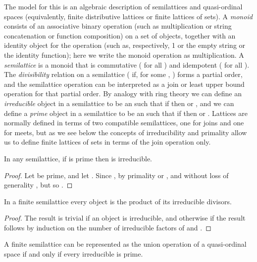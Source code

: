 \documentclass[11pt]{llncs}
\begin{document}
{The model for this is an algebraic description of semilattices and quasi-ordinal spaces (equivalently, finite distributive lattices or finite lattices of sets). A \emph{monoid} consists of an associative binary operation (such as multiplication or string concatenation or function composition) on a set of objects, together with an identity object for the operation (such as, respectively, 1 or the empty string or the identity function); here we write the monoid operation as multiplication. A \emph{semilattice} is a monoid that is commutative ( for all ) and idempotent ( for all ). The \emph{divisibility} relation on a semilattice ( if, for some , ) forms a partial order, and the semilattice operation can be interpreted as a join or least upper bound operation for that partial order. By analogy with ring theory we can define an \emph{irreducible} object in a semilattice to be an  such that if  then  or , and we can define a \emph{prime} object in a semilattice to be an  such that if  then  or . Lattices are normally defined in terms of two compatible semilattices, one for joins and one for meets, but as we see below the concepts of irreducibility and primality allow us to define finite lattices of sets in terms of the join operation only.

\begin{lemma}
In any semilattice, if  is prime then  is irreducible.
\end{lemma}

\begin{proof}
Let  be prime, and let . Since , by primality  or , and without loss of generality , but  so .
\end{proof}

\begin{lemma}
\label{lem:prodirrediv}
In a finite semilattice every object is the product of its irreducible divisors.
\end{lemma}

\begin{proof}
The result is trivial if an object  is irreducible, and otherwise if  the result follows by induction on the number of irreducible factors of  and .
\end{proof}

\begin{theorem}
A finite semilattice can be represented as the union operation of a quasi-ordinal space if and only if every irreducible is prime.
\end{theorem}

}
\end{document}
